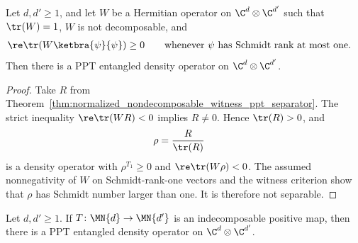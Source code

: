 \begin{theorem}
    \label{thm:normalized_nondecomposable_witness_detects_ppt_entanglement}
    \leanok
    Let $d,d'\geq1$, and let $W$ be a Hermitian operator on
    $\C^d\otimes\C^{d'}$ such that $\tr(W)=1$, $W$ is not decomposable, and
    \begin{align}
        \re\tr\!\left(W\ketbra{\psi}{\psi}\right)&\geq0
        \qquad\text{whenever $\psi$ has Schmidt rank at most one}.
        \notag
    \end{align}
    Then there is a PPT entangled density operator on
    $\C^d\otimes\C^{d'}$.
\end{theorem}

\begin{proof}
    \leanok
    Take $R$ from
    Theorem~\ref{thm:normalized_nondecomposable_witness_ppt_separator}.
    The strict inequality $\re\tr(WR)<0$ implies $R\neq0$. Hence
    $\tr(R)>0$, and
    \begin{align}
        \rho&=\frac{R}{\tr(R)}
        \notag
    \end{align}
    is a density operator with $\rho^{T_1}\geq0$ and
    $\re\tr(W\rho)<0$. The assumed nonnegativity of $W$ on Schmidt-rank-one
    vectors and the witness criterion show that $\rho$ has Schmidt number
    larger than one. It is therefore not separable.
\end{proof}

\begin{theorem}
    \label{thm:indecomposable_map_gives_ppt_entangled_state}
    \leanok
    Let $d,d'\geq1$. If
    $T\colon\MN{d}\to\MN{d'}$ is an indecomposable positive map, then there
    is a PPT entangled density operator on $\C^d\otimes\C^{d'}$.
\end{theorem}


